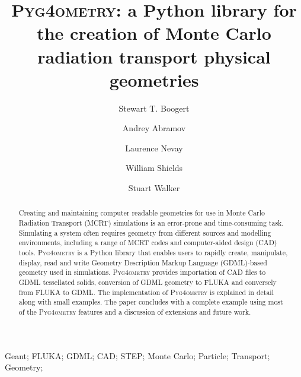 \documentclass[final,5p,times,twocolumn]{elsarticle}
\newcommand{\PYGEOMETRY}{\textsc{Pyg4ometry}}
\begin{document}
\begin{frontmatter}



\title{\PYGEOMETRY{}: a Python library for the creation of Monte Carlo radiation transport physical geometries}


\author[a]{Stewart T. Boogert}
\author[a]{Andrey Abramov}
\author[a]{Laurence Nevay}
\author[a]{William Shields}
\author[a]{Stuart Walker}

\address[a]{John Adams Institute at Royal Holloway, Department of Physics, Royal Holloway, Egham, TW20 0EX, Surrey, UK}

\begin{abstract}
Creating and maintaining computer readable geometries for use in Monte Carlo Radiation Transport (MCRT) simulations is an
error-prone and time-consuming task. Simulating a system often requires geometry from different sources and modelling 
environments, including a range of MCRT codes and computer-aided design (CAD) tools. \PYGEOMETRY{} is a Python library 
that enables users to rapidly create, manipulate, display, read and write Geometry Description Markup Language (GDML)-based
geometry used in simulations. \PYGEOMETRY{} provides importation of CAD files to GDML tessellated solids, conversion of GDML geometry
to FLUKA and conversely from FLUKA to GDML. The implementation of \PYGEOMETRY{} is explained in detail along with small  
examples. The paper concludes with a complete example using most of the \PYGEOMETRY{} features and a discussion of 
extensions and future work.
\end{abstract}

\begin{keyword}
Geant; FLUKA; GDML; CAD; STEP; Monte Carlo; Particle; Transport; Geometry; 

\end{keyword}

\end{frontmatter}
\end{document}
